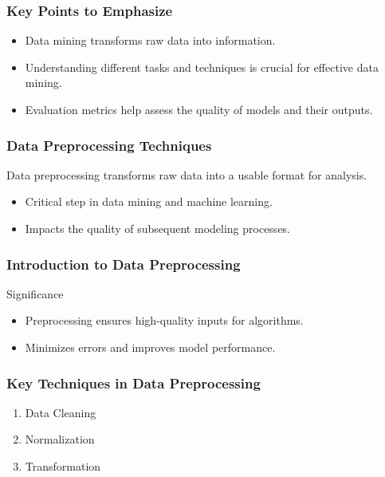 \documentclass{beamer}
\begin{document}
\begin{frame}[fragile]
    \frametitle{Key Points to Emphasize}
    \begin{itemize}
        \item Data mining transforms raw data into information.
        \item Understanding different tasks and techniques is crucial for effective data mining.
        \item Evaluation metrics help assess the quality of models and their outputs.
    \end{itemize}
\end{frame}

\begin{frame}
    \frametitle{Data Preprocessing Techniques}
    Data preprocessing transforms raw data into a usable format for analysis.
    \begin{itemize}
        \item Critical step in data mining and machine learning.
        \item Impacts the quality of subsequent modeling processes.
    \end{itemize}
\end{frame}

\begin{frame}
    \frametitle{Introduction to Data Preprocessing}
    \begin{block}{Significance}
        \begin{itemize}
            \item Preprocessing ensures high-quality inputs for algorithms.
            \item Minimizes errors and improves model performance.
        \end{itemize}
    \end{block}
\end{frame}

\begin{frame}
    \frametitle{Key Techniques in Data Preprocessing}
    \begin{enumerate}
        \item Data Cleaning
        \item Normalization
        \item Transformation
    \end{enumerate}
\end{frame}
\end{document}
